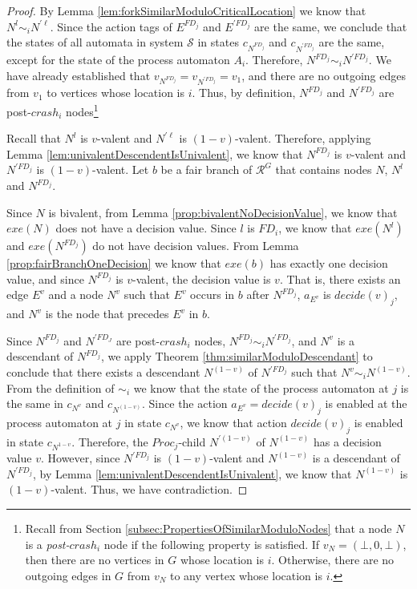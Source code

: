 \documentclass[11pt]{article}
\numberwithin{theorem}{section}
\begin{document}
\begin{proof}
By Lemma \ref{lem:forkSimilarModuloCriticalLocation} we know that $N^{l} \sim_i N^{\prime \ell}$. Since the action tags of $E^{FD_j}$ and $E^{\prime FD_j}$ are the same, we conclude that the states of all automata in system $\mathcal{S}$ in states $c_{N^{FD_j}}$ and $c_{N^{\prime FD_j}}$ are the same, except for the state of the process automaton $A_i$. Therefore, $N^{FD_j} \sim_i N^{\prime FD_j}$. We have already established that $v_{N^{FD_j}} = v_{N^{\prime FD_j}} = v_1$, and there are no outgoing edges from $v_1$ to vertices whose location is $i$. Thus, by definition, $N^{FD_j}$ and $N^{\prime FD_j}$ are post-$crash_i$ nodes\footnote{Recall from Section \ref{subsec:PropertiesOfSimilarModuloNodes} that a node $N$ is a \emph{post-$crash_i$} node if the following property is satisfied. If $v_N = (\bot, 0 ,\bot)$, then there are no vertices in $G$ whose location is $i$. Otherwise, there are no outgoing edges in $G$ from $v_N$ to any vertex whose location is $i$.}





Recall that $N^l$ is $v$-valent and $N^{\prime \ell}$ is $(1-v)$-valent. Therefore, applying Lemma \ref{lem:univalentDescendentIsUnivalent}, we know that $N^{FD_j}$ is $v$-valent and $N^{\prime FD_j}$  is $(1-v)$-valent. Let $b$ be a fair branch of $\mathcal{R}^G$ that contains nodes $N$, $N^l$ and $N^{FD_j}$.

Since $N$ is bivalent, from Lemma \ref{prop:bivalentNoDecisionValue}, we know that $exe(N)$ does not have a decision value. Since $l$ is $FD_i$, we know that $exe(N^l)$ and $exe(N^{FD_j})$ do not have decision values. From Lemma \ref{prop:fairBranchOneDecision} we know that $exe(b)$ has exactly one decision value, and since $N^{FD_j}$ is $v$-valent, the decision value is $v$. 
 That is, there exists an edge $E^v$ and a node $N^v$ such that $E^v$ occurs in $b$ after $N^{FD_j}$, $a_{E^v}$ is $decide(v)_j$, and $N^v$ is the node that precedes $E^v$ in $b$. 
 
  Since $N^{FD_j}$ and $N^{\prime FD_J}$ are post-$crash_i$ nodes, $N^{FD_j} \sim_i N^{\prime FD_j}$, and $N^v$ is a descendant of $N^{FD_j}$, we apply Theorem \ref{thm:similarModuloDescendant} to conclude that there exists a descendant $N^{(1-v)}$ of $N^{\prime FD_j}$ such that $N^v \sim_i N^{(1-v)}$. From the definition of $\sim_i$ we know that the state of the process automaton at $j$ is the same in $c_{N^v}$ and $c_{N^{(1-v)}}$. Since the action $a_{E^v} = decide(v)_j$ is enabled at the process automaton at $j$ in state $c_{N^v}$, we know that action $decide(v)_j$ is enabled in state $c_{N^{1-v}}$. Therefore, the $Proc_j$-child $N^{\prime (1-v)}$ of $N^{(1-v)}$ has a decision value $v$. However, since $N^{\prime FD_j}$  is $(1-v)$-valent and $N^{(1-v)}$ is a descendant of $N^{\prime FD_j}$, by Lemma \ref{lem:univalentDescendentIsUnivalent}, we know that $N^{(1-v)}$ is $(1-v)$-valent. Thus, we have contradiction.
\end{proof}
\end{document}
